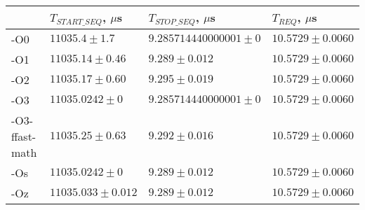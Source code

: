 \begin{tabular}{llll}
\toprule
 & $T_{START\_SEQ}$, $\mu$s & $T_{STOP\_SEQ}$, $\mu$s & $T_{REQ}$, $\mu$s \\
\midrule
-O0 & $11035.4 \pm 1.7$ & $9.285714440000001 \pm 0$ & $10.5729 \pm 0.0060$ \\
-O1 & $11035.14 \pm 0.46$ & $9.289 \pm 0.012$ & $10.5729 \pm 0.0060$ \\
-O2 & $11035.17 \pm 0.60$ & $9.295 \pm 0.019$ & $10.5729 \pm 0.0060$ \\
-O3 & $11035.0242 \pm 0$ & $9.285714440000001 \pm 0$ & $10.5729 \pm 0.0060$ \\
-O3-ffast-math & $11035.25 \pm 0.63$ & $9.292 \pm 0.016$ & $10.5729 \pm 0.0060$ \\
-Os & $11035.0242 \pm 0$ & $9.289 \pm 0.012$ & $10.5729 \pm 0.0060$ \\
-Oz & $11035.033 \pm 0.012$ & $9.289 \pm 0.012$ & $10.5729 \pm 0.0060$ \\
\bottomrule
\end{tabular}
